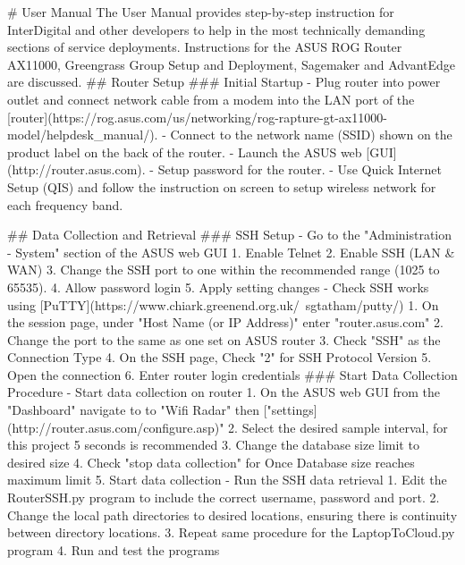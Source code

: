 
\label{appendix:user_manual}





\begin{markdown}
# User Manual 
The User Manual provides step-by-step instruction for InterDigital and other developers to help in the most technically demanding sections of service deployments. Instructions for the ASUS ROG Router AX11000, Greengrass Group Setup and Deployment, Sagemaker and AdvantEdge are discussed.
## Router Setup
### Initial Startup
- Plug router into power outlet and connect network cable from a modem into the LAN port of the [router](https://rog.asus.com/us/networking/rog-rapture-gt-ax11000-model/helpdesk_manual/). 
- Connect to the network name (SSID) shown on the product label on the back of the router. 
- Launch the ASUS web [GUI](http://router.asus.com).
- Setup password for the router. 
- Use Quick Internet Setup (QIS) and follow the instruction on screen to setup wireless network for each frequency band. 

## Data Collection and Retrieval
### SSH Setup
- Go to the "Administration - System" section of the ASUS web GUI 
    1. Enable Telnet
    2. Enable SSH (LAN & WAN)
    3. Change the SSH port to one within the recommended range (1025 to 65535). 
    4. Allow password login
    5. Apply setting changes
- Check SSH works using [PuTTY](https://www.chiark.greenend.org.uk/~sgtatham/putty/)
    1. On the session page, under "Host Name (or IP Address)"  enter "router.asus.com"
    2. Change the port to the same as one set on ASUS router
    3. Check "SSH" as the Connection Type 
    4. On the SSH page, Check "2" for SSH Protocol Version
    5. Open the connection
    6. Enter router login credentials 
### Start Data Collection Procedure
- Start data collection on router
    1. On the ASUS web GUI from the "Dashboard" navigate to to "Wifi Radar" then ["settings](http://router.asus.com/configure.asp)"
    2. Select the desired sample interval, for this project 5 seconds is recommended
    3. Change the database size limit to desired size
    4. Check "stop data collection" for Once Database size reaches maximum limit
    5. Start data collection 
- Run the SSH data retrieval 
    1. Edit the RouterSSH.py program to include the correct username, password and port.
    2. Change the local path directories to desired locations, ensuring there is continuity between directory locations. 
    3. Repeat same procedure for the LaptopToCloud.py program
    4. Run and test the programs







\end{markdown}
